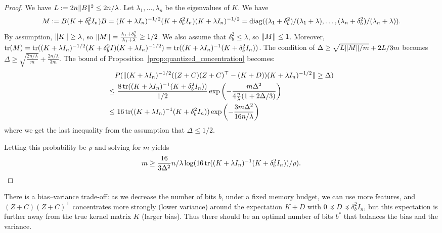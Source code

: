 \begin{proof}
  We have $L := 2n \|B\|^2 \leq 2n/\lambda$.
  Let $\lambda_1, \dots, \lambda_n$ be the eigenvalues of $K$.
  We have
  \begin{equation*}
    M \defeq B(K + \delta^2_b I_n) B =  (K + \lambda I_n)^{-1/2} (K + \delta^2_b I_n) (K + \lambda
    I_n)^{-1/2} = \diag((\lambda_1 + \delta^2_b)/(\lambda_1 + \lambda), \dots,
    (\lambda_n + \delta^2_b) / (\lambda_n + \lambda)).
  \end{equation*}
  By assumption, $\|K\| \geq \lambda$, so $\|M\| = \frac{\lambda_1 + \delta^2_b}{\lambda_1 + \lambda} \geq
  1/2$.
  We also assume that $\delta^2_b \leq \lambda$, so $\|M\| \leq 1$.
  Moreover, $\mathop{\rm tr}(M) = \mathop{\rm tr}((K + \lambda I_n)^{-1/2} (K + \delta^2_b I) (K + \lambda I_n)^{-1/2}) =
  \mathop{\rm tr}((K + \lambda I_n)^{-1} (K + \delta^2_b I_n))$.
  The condition of $\Delta \geq \sqrt{L \|M\| / m} + 2L/3m$ becomes $\Delta \geq \sqrt{\frac{2n/\lambda}{m}} + \frac{2n/\lambda}{3m}$.
  The bound of Proposition~\ref{prop:quantized_concentration} becomes:
  \begin{align*}
    &P(\|(K + \lambda I_n)^{-1/2} ((Z + C) (Z + C)^\top - (K + D)) (K + \lambda
      I_n)^{-1/2}\| \geq \Delta) \\
    \leq&\ \frac{8 \mathop{\rm tr}((K + \lambda I_n)^{-1} (K + \delta^2_b I_n))}{1/2} \exp \left( -\frac{m
      \Delta^2}{4\frac{n}{\lambda} (1 + 2\Delta/3)} \right) \\
    \leq&\ 16 \mathop{\rm tr}((K + \lambda I_n)^{-1} (K + \delta^2_b I_n)) \exp \left( -\frac{3m\Delta^2}{16n/\lambda} \right)
  \end{align*}
  where we get the last inequality from the assumption that $\Delta \leq 1/2$.

  Letting this probability be $\rho$ and solving for $m$ yields
  \begin{equation*}
    m \geq \frac{16}{3 \Delta^2} n/\lambda \log (16 \mathop{\rm tr}((K + \lambda I_n)^{-1} (K + \delta^2_b I_n)) / \rho).
  \end{equation*}

\end{proof}

There is a bias--variance trade-off: as we decrease the number of bits $b$, under
a fixed memory budget, we can use more features, and $(Z + C)(Z + C)^\top$
concentrates more strongly (lower variance) around the expectation $K + D$ with
$0 \preceq D \preceq \delta^2_b I_n$, but this expectation is further away from the true kernel
matrix $K$ (larger bias).
Thus there should be an optimal number of bits $b^*$ that balances the bias and
the variance.

